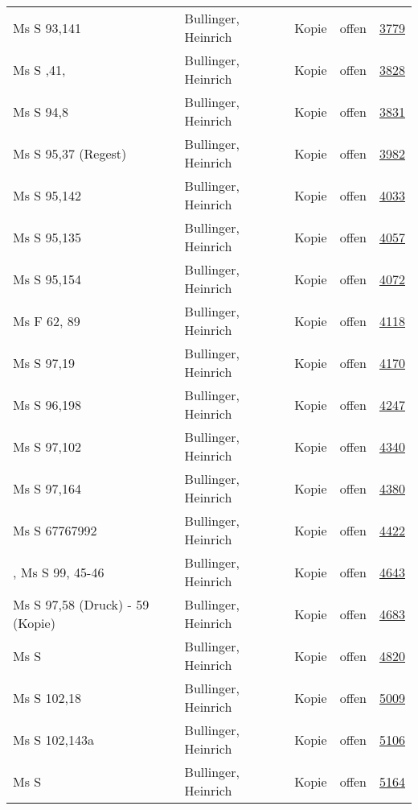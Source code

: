 \documentclass[10pt,a4paper,landscape]{report}
\begin{document}
\begin{longtable}{p{16cm}p{4cm}llr}
Ms S 93,141	&	Bullinger, Heinrich	&	Kopie	&	offen	&	\href{http://130.60.24.72/assignment/3779}{3779}\\
Ms S ,41,	&	Bullinger, Heinrich	&	Kopie	&	offen	&	\href{http://130.60.24.72/assignment/3828}{3828}\\
Ms S 94,8	&	Bullinger, Heinrich	&	Kopie	&	offen	&	\href{http://130.60.24.72/assignment/3831}{3831}\\
Ms S 95,37 (Regest)	&	Bullinger, Heinrich	&	Kopie	&	offen	&	\href{http://130.60.24.72/assignment/3982}{3982}\\
Ms S 95,142	&	Bullinger, Heinrich	&	Kopie	&	offen	&	\href{http://130.60.24.72/assignment/4033}{4033}\\
Ms S 95,135	&	Bullinger, Heinrich	&	Kopie	&	offen	&	\href{http://130.60.24.72/assignment/4057}{4057}\\
Ms S 95,154	&	Bullinger, Heinrich	&	Kopie	&	offen	&	\href{http://130.60.24.72/assignment/4072}{4072}\\
Ms F 62, 89	&	Bullinger, Heinrich	&	Kopie	&	offen	&	\href{http://130.60.24.72/assignment/4118}{4118}\\
Ms S 97,19	&	Bullinger, Heinrich	&	Kopie	&	offen	&	\href{http://130.60.24.72/assignment/4170}{4170}\\
Ms S 96,198	&	Bullinger, Heinrich	&	Kopie	&	offen	&	\href{http://130.60.24.72/assignment/4247}{4247}\\
Ms S 97,102	&	Bullinger, Heinrich	&	Kopie	&	offen	&	\href{http://130.60.24.72/assignment/4340}{4340}\\
Ms S 97,164	&	Bullinger, Heinrich	&	Kopie	&	offen	&	\href{http://130.60.24.72/assignment/4380}{4380}\\
Ms S 67767992	&	Bullinger, Heinrich	&	Kopie	&	offen	&	\href{http://130.60.24.72/assignment/4422}{4422}\\
, Ms S 99, 45-46	&	Bullinger, Heinrich	&	Kopie	&	offen	&	\href{http://130.60.24.72/assignment/4643}{4643}\\
Ms S 97,58 (Druck) - 59 (Kopie)	&	Bullinger, Heinrich	&	Kopie	&	offen	&	\href{http://130.60.24.72/assignment/4683}{4683}\\
Ms S	&	Bullinger, Heinrich	&	Kopie	&	offen	&	\href{http://130.60.24.72/assignment/4820}{4820}\\
Ms S 102,18	&	Bullinger, Heinrich	&	Kopie	&	offen	&	\href{http://130.60.24.72/assignment/5009}{5009}\\
Ms S 102,143a	&	Bullinger, Heinrich	&	Kopie	&	offen	&	\href{http://130.60.24.72/assignment/5106}{5106}\\
Ms S	&	Bullinger, Heinrich	&	Kopie	&	offen	&	\href{http://130.60.24.72/assignment/5164}{5164}\\

\end{longtable}
\end{document}

